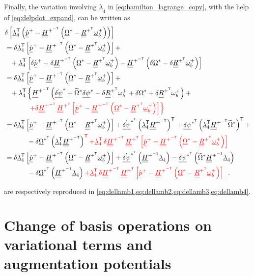 \documentclass[12pt,a4paper,oneside,english]{abntex2} %
\newcommand{\fix}[1]{{\color{red}#1}}
\newcommand{\vect}[1]{\underline{#1}}
\def\tens#1{\underline{\underline{#1}}}
\def\til#1{\widetilde{#1}}
\def\lb{\left[}
\def\rb{\right]}
\def\lp{\left(}
\def\rp{\right)}
\def\T{\mathsf{T}}
\def\R{\tens{R}}
\def\RpT{\R^{+^\T}}
\def\om{\vect{\omega}_b}
\def\omp{\om^{+}}
\def\Om{\vect{\Omega}}
\def\Oms{\Om^{*}}
\def\OmsT{\Om^{*^\T}}
\def\Omtil{\til{\Omega}}
\def\Omtils{\Omtil^{*}}
\def\H{\tens{H}}
\def\HpT{\H^{+^\T}}
\def\Hpinv{\H^{+^{-1}}}
\def\HpmT{\H^{+^{-\T}}}
\def\p{\vect{p}}
\def\pdot{\dot{\p}}
\def\ppdot{\pdot^{+}}
\def\delpsi{\vect{\delta\psi}}
\def\delpsis{\delpsi^*}
\def\delpsisT{\delpsi^{*^\T}}
\def\delpsidot{\dot{\delpsi}}
\def\delpsisdot{\delpsidot^{*}}
\def\delpsisdotT{\delpsidot^{*^\T}}
\def\lamb{\vect{\lambda}}
\begin{document}
\begin{apendicesenv}
Finally, the variation involving $\lamb_4$ in \cref{eq:hamilton_lagrange_copy}, with the help of \cref{eq:delpdot_expand}, can be written as
\begin{align}
    &\delta\lb\lamb_4^\T\lp\ppdot-\HpmT\lp\Oms-\RpT\omp\rp\rp\rb \nonumber
    \\
    &=\delta\lamb_4^\T\lb\ppdot-\HpmT\lp\Oms-\RpT\omp\rp\rb + \nonumber 
    \\ & \hphantom{=} + \lamb_4^\T \lb \delta\ppdot - \delta\HpmT\lp\Oms-\RpT\omp\rp  - \HpmT\lp\delta\Oms-\delta\RpT\omp\rp \rb \nonumber
    \\
    &=\delta\lamb_4^\T\lb\ppdot-\HpmT\lp\Oms-\RpT\omp\rp\rb + \nonumber 
    \\ & \hphantom{=} + \lamb_4^\T \left\{ \HpmT \lp \delpsisdot + \Omtils\delpsis - \delta\RpT\omp + \delta\Oms+\delta\RpT\omp \rp + \right. \nonumber 
    \\ & \hphantom{= + \lamb_4^\T \left[\right.} \fix{\left. + \delta\HpmT\,\HpT\lb\ppdot-\HpmT\lp\Oms-\RpT\omp\rp\rb\right\}} \nonumber
    \\
    &=\delta\lamb_4^\T\lb\ppdot-\HpmT\lp\Oms-\RpT\omp\rp\rb + \delpsisdotT\lp\lamb_4^\T\HpmT\rp^\T + 
    \delpsisT\lp\lamb_4^\T\HpmT\Omtils\rp^\T + \nonumber \\ & \hphantom{=\delta\lamb_4^\T\left[\right.} -\delta\OmsT\lp\lamb_4^\T\HpmT\rp^{\fix{\T}} \fix{+ \lamb_4^\T\,\delta\HpmT\,\HpT\lb\ppdot-\HpmT\lp\Oms-\RpT\omp\rp\rb} \nonumber
    \\
    &=\delta\lamb_4^\T\lb\ppdot-\HpmT\lp\Oms-\RpT\omp\rp\rb +
    \delpsisdotT\lp\Hpinv\lamb_4\rp - \delpsisT\lp\Omtils\Hpinv\lamb_4\rp \nonumber \\ & \hphantom{=\delta\lamb_4^\T\left[\right.} -\delta\OmsT\lp\Hpinv\lamb_4\rp \fix{+ \lamb_4^\T\,\delta\HpmT\,\HpT\lb\ppdot-\HpmT\lp\Oms-\RpT\omp\rp\rb} \ \ .
    \label{eq:dellambda4_exp}
\end{align}

 are respectively reproduced in \cref{eq:dellamb1,eq:dellamb2,eq:dellamb3,eq:dellamb4}.

\section{Change of basis operations on variational terms and augmentation potentials}


\end{apendicesenv}
\end{document}
